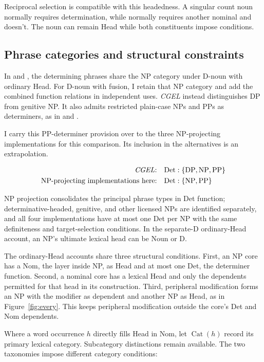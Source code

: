 \documentclass[12pt]{article}
\begin{document}
Reciprocal selection is compatible with this headedness. A singular count noun normally requires determination, while  normally requires another nominal and  doesn't. The noun can remain Head while both constituents impose conditions.

\subsection{Phrase categories and structural constraints}\label{sec:det-uniform}

In  and , the determining phrases share the NP category under D-noun with ordinary Head. For D-noun with fusion, I retain that NP category and add the combined function relations in independent uses. \textit{CGEL} instead distinguishes DP from genitive NP. It also admits restricted plain-case NPs and PPs as determiners, as in  and  \citep[Ch.~5, §4]{huddleston2002}.

I carry this PP-determiner provision over to the three NP-projecting implementations for this comparison. Its inclusion in the alternatives is an extrapolation.

\[
\begin{aligned}
\text{\textit{CGEL}:} &\quad \mathrm{Det}:\{\mathrm{DP},\mathrm{NP},\mathrm{PP}\} \\
\text{NP-projecting implementations here:} &\quad \mathrm{Det}:\{\mathrm{NP},\mathrm{PP}\}
\end{aligned}
\]

NP projection consolidates the principal phrase types in Det function; determinative-headed, genitive, and other licensed NPs are identified separately, and all four implementations have at most one Det per NP with the same definiteness and target-selection conditions. In the separate-D ordinary-Head account, an NP's ultimate lexical head can be Noun or D.

The ordinary-Head accounts share three structural conditions. First, an NP core has a Nom, the layer inside NP, as Head and at most one Det, the determiner function. Second, a nominal core has a lexical Head and only the dependents permitted for that head in its construction. Third, peripheral modification forms an NP with the modifier as dependent and another NP as Head, as in Figure~\ref{fig:every}. This keeps peripheral modification outside the core's Det and Nom dependents.

Where a word occurrence $h$ directly fills Head in Nom, let $\operatorname{Cat}(h)$ record its primary lexical category. Subcategory distinctions remain available. The two taxonomies impose different category conditions:
\end{document}
